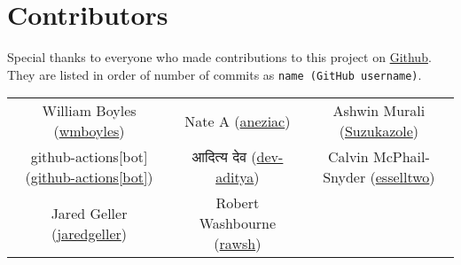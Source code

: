 \section{Contributors}
Special thanks to everyone who made contributions to this project on \href{https://github.com/wmboyles/Math-Summaries}{Github}.
They are listed in order of number of commits as \texttt{name (GitHub username)}.

\begin{center}
    \begin{tabular}{ c c c }
    	William Boyles (\href{https://github.com/wmboyles}{wmboyles}) & Nate A (\href{https://github.com/aneziac}{aneziac}) & Ashwin Murali (\href{https://github.com/Suzukazole}{Suzukazole}) \\
		github-actions[bot] (\href{https://github.com/apps/github-actions}{github-actions[bot]}) & आदित्य देव (\href{https://github.com/dev-aditya}{dev-aditya}) & Calvin McPhail-Snyder (\href{https://github.com/esselltwo}{esselltwo}) \\
		Jared Geller (\href{https://github.com/jaredgeller}{jaredgeller}) & Robert Washbourne (\href{https://github.com/rawsh}{rawsh})\end{tabular}
\end{center}
